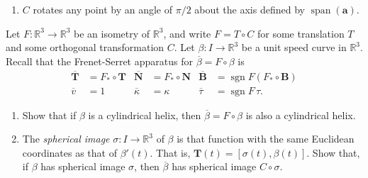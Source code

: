 \documentclass[12 pt, letterpaper]{hmcpset}
\begin{document}
\begin{solution}
\begin{enumerate}
\[\begin{split}
									& = \lVert C(\mathbf{p} - \mathbf{q}) \rVert \\
									& = \lVert \mathbf{p} - \mathbf{q} \rVert \\
									& = d(\mathbf{p}, \mathbf{q}).
				\end{split}
			\] \\
			Since $C$ preserves norms and distances, it is an orthogonal transformation.
		\item $C$ rotates any point by an angle of $\pi/2$ about the axis defined by $\operatorname{span}(\mathbf{a})$.
	\end{enumerate}
\end{solution}

\pagebreak

\begin{problem}[Problem 4.]
	Let $F : \mathbb{R}^{3} \to \mathbb{R}^{3}$ be an isometry of $\mathbb{R}^{3}$, and write $F = T \circ C$ for some translation $T$ and some orthogonal transformation $C$. Let $\beta : I \to \mathbb{R}^{3}$ be a unit speed curve in $\mathbb{R}^{3}$. Recall that the Frenet-Serret apparatus for $\overline{\beta} = F \circ \beta$ is
	\begin{align*}
		\overline{\mathbf{T}} & = F_{*} \circ \mathbf{T} & \overline{\mathbf{N}} & = F_{*} \circ \mathbf{N} & \overline{\mathbf{B}} & = \operatorname{sgn} F (F_{*} \circ \mathbf{B}) \\
		\overline{v} & = 1 & \overline{\kappa} & = \kappa & \overline{\tau} & = \operatorname{sgn} F \, \tau.
	\end{align*}
	\begin{enumerate}
		\item Show that if $\beta$ is a cylindrical helix, then $\overline{\beta} = F \circ \beta$ is also a cylindrical helix.
		\item The \textit{spherical image} $\sigma : I \to \mathbb{R}^{3}$ of $\beta$ is that function with the same Euclidean coordinates as that of $\beta'(t)$. That is, $\mathbf{T}(t) = [\sigma(t), \beta(t)]$. Show that, if $\beta$ has spherical image $\sigma$, then $\overline{\beta}$ has spherical image $C \circ \sigma$.
	\end{enumerate}
\end{problem}
\end{document}
